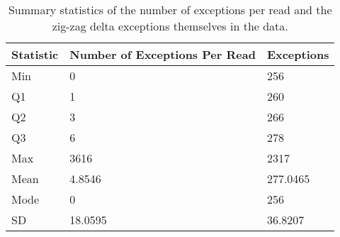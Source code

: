 \begin{table}
    \caption{\label{tab:ex} Summary statistics of the number of exceptions per read and the zig-zag delta exceptions themselves in the data.}
	\begin{tabular}{|l|m{1.8cm}|l|}
	    \hline
	    Statistic & Number of Exceptions Per Read & Exceptions\\
        \hline
		Min &0 & 256\\
		Q1 & 1& 260\\

		Q2 & 3& 266\\
		Q3 & 6& 278\\
		Max & 3616& 2317\\
\hline
		Mean & 4.8546&277.0465\\
		Mode & 0&256\\
		SD & 18.0595&36.8207\\
	\hline
    \end{tabular}
\end{table}
